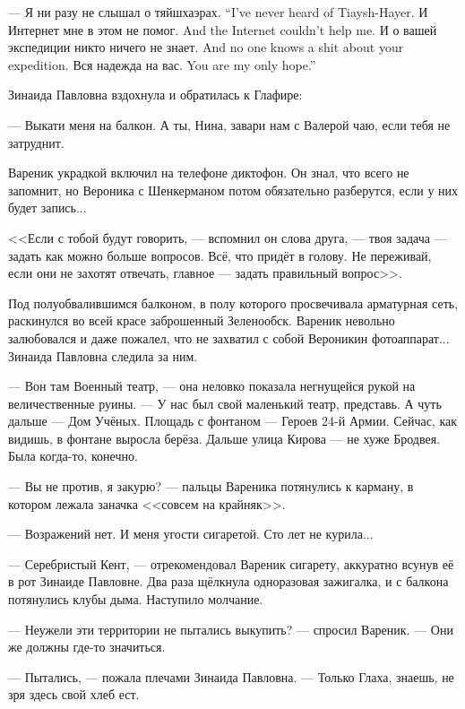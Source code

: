 {--- Я ни разу не слышал о тяйшхаэрах.}
{``I've never heard of Tiaysh-Hayer.}
{И Интернет мне в этом не помог.}
{And the Internet couldn't help me.}
{И о вашей экспедиции никто ничего не знает.}
{And no one knows a shit about your expedition.}
{Вся надежда на вас.}
{You are my only hope.''}

Зинаида Павловна вздохнула и обратилась к Глафире:

--- Выкати меня на балкон.
А ты, Нина, завари нам с Валерой чаю, если тебя не затруднит.

\asterism

\textspace

Вареник украдкой включил на телефоне диктофон.
Он знал, что всего не запомнит, но Вероника с Шенкерманом потом обязательно разберутся, если у них будет запись...

<<Если с тобой будут говорить, --- вспомнил он слова друга, --- твоя задача --- задать как можно больше вопросов.
Всё, что придёт в голову.
Не переживай, если они не захотят отвечать, главное --- задать правильный вопрос>>.

Под полуобвалившимся балконом, в полу которого просвечивала арматурная сеть, раскинулся во всей красе заброшенный Зеленообск.
Вареник невольно залюбовался и даже пожалел, что не захватил с собой Вероникин фотоаппарат...
Зинаида Павловна следила за ним.

--- Вон там Военный театр, --- она неловко показала негнущейся рукой на величественные руины.
--- У нас был свой маленький театр, представь.
А чуть дальше --- Дом Учёных.
Площадь с фонтаном --- Героев 24-й Армии.
Сейчас, как видишь, в фонтане выросла берёза.
Дальше улица Кирова --- не хуже Бродвея.
Была когда-то, конечно.

--- Вы не против, я закурю? --- пальцы Вареника потянулись к карману, в котором лежала заначка <<совсем на крайняк>>.

--- Возражений нет.
И меня угости сигаретой.
Сто лет не курила...

--- Серебристый Кент, --- отрекомендовал Вареник сигарету, аккуратно всунув её в рот Зинаиде Павловне.
Два раза щёлкнула одноразовая зажигалка, и с балкона потянулись клубы дыма.
Наступило молчание.

--- Неужели эти территории не пытались выкупить? --- спросил Вареник.
--- Они же должны где-то значиться.

--- Пытались, --- пожала плечами Зинаида Павловна.
--- Только Глаха, знаешь, не зря здесь свой хлеб ест.

